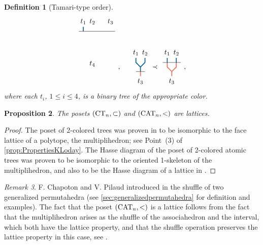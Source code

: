 \documentclass[10pt]{amsart}
\newtheorem{definition}{Definition}[section]
\newtheorem{proposition}[definition]{Proposition}
\theoremstyle{remark}
\newtheorem{remark}[definition]{\sc Remark}
\begin{document}
\begin{definition}[Tamari-type order]
\[{{{\begin{tikzpicture}[yscale=0.45,xscale=0.45]
\draw[very thick, MidnightBlue] (-1,2.5)--(-1,3) ;
%
\draw (-1.5,2.5) --(2.5, 2.5);
%
\draw (2,3) node[above] {$t_3$}; 
\draw (0,3) node[above] {$t_2$}; 
\draw (-1,3) node[above] {$t_1$}; 
\draw (0,-0.5) node[below] {$t_4$}; 
\end{tikzpicture}}}}\ , \quad 
{\vcenter{\hbox{
\begin{tikzpicture}[yscale=0.45,xscale=0.45]
\draw[very thick, MidnightBlue] (0,0.5)--(0,1);
\draw[very thick, MidnightBlue] (0,1)--(-0.5,1.5)--(-0.5,2);
\draw[very thick, MidnightBlue] (0,1)--(0.5,1.5)--(0.5,2);
% 
\draw[very thick, Red!60] (0,0)--(0,0.5);
\draw (-0.5,0.5) --(0.5, 0.5);
%
\draw (-0.5,2) node[above] {$t_1$}; 
\draw (0.5,2) node[above] {$t_2$}; 
\draw (0,0) node[below] {$t_3$}; 
\end{tikzpicture}}}}
\prec
{\vcenter{\hbox{
\begin{tikzpicture}[yscale=0.45,xscale=0.45]
\draw[very thick, MidnightBlue] (-0.5,2)--(-0.5,2.5);
\draw[very thick, MidnightBlue] (0.5,2)--(0.5,2.5);
%
\draw[very thick, Red!60] (0,0.5)--(0,1);
\draw[very thick, Red!60] (0,1)--(-0.5,1.5)--(-0.5,2);
\draw[very thick, Red!60] (0,1)--(0.5,1.5)--(0.5,2);
% 
\draw (-1,2) --(1, 2);
%
\draw (-0.5,2.5) node[above] {$t_1$}; 
\draw (0.5,2.5) node[above] {$t_2$}; 
\draw (0,0.5) node[below] {$t_3$}; 
\end{tikzpicture}}}}
\ ,\]
where each $t_i$, $1\leq i\leq 4$, is a binary tree of the appropriate color. 
\end{definition}

\begin{proposition}
The posets $(\mathrm{CT}_{n}, \subset)$ and $(\mathrm{CAT}_{n}, <)$ are lattices. 
\end{proposition}

\begin{proof}
The poset of 2-colored trees was proven in \cite{Forcey08} to be isomorphic to the face lattice of a polytope, the multiplihedron; see Point~(3) of \cref{prop:PropertiesKLoday}. 
The Hasse diagram of the poset of 2-colored atomic trees was proven to be isomorphic to the oriented 1-skeleton of the multiplihedron, and also to be the Hasse diagram of a lattice in \cite[Proposition 117]{CP22}.
\end{proof}

\begin{remark}
F. Chapoton and V. Pilaud introduced in \cite{CP22} the shuffle of two generalized permutahedra (see \cref{sec:generalizedpermutahedra} for definition and examples).
The fact that the poset $(\mathrm{CAT}_{n}, <)$ is a lattice follows from the fact that the multiplihedron arises as the shuffle of the associahedron and the interval, which both have the lattice property, and that the shuffle operation preserves the lattice property in this case, see \cite[Corollary 95]{CP22}. 
\end{remark}
\end{document}

